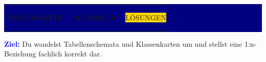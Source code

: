 \documentclass[10pt,a4paper]{article}
\begin{document}
\colorbox{Navy}{\parbox{\dimexpr\linewidth-2\fboxsep\relax}{%
  \vspace{3mm}\color{white}\begin{tabularx}{\linewidth}{@{}Xr@{}}
  {\small\bfseries INFORMATIK · KLASSE 10} & \colorbox{Gold}{\color{Navy}\small\bfseries\strut LÖSUNGEN}\end{tabularx}
  \par
  \vspace{0.8mm}{\large Sicherungsblatt}\vspace{2.8mm}}}

\vspace{2.5mm}
\colorbox{Sky}{\parbox{\dimexpr\linewidth-2\fboxsep\relax}{\vspace{1.6mm}
\textcolor{Blue}{\bfseries Ziel:} Du wandelst Tabellenschemata und Klassenkarten um und stellst eine 1:n-Beziehung fachlich korrekt dar.\vspace{1.6mm}}}
\end{document}
